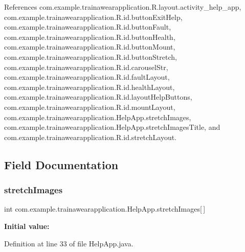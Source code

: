 References com.\+example.\+trainawearapplication.\+R.\+layout.\+activity\+\_\+help\+\_\+app, com.\+example.\+trainawearapplication.\+R.\+id.\+button\+Exit\+Help, com.\+example.\+trainawearapplication.\+R.\+id.\+button\+Fault, com.\+example.\+trainawearapplication.\+R.\+id.\+button\+Health, com.\+example.\+trainawearapplication.\+R.\+id.\+button\+Mount, com.\+example.\+trainawearapplication.\+R.\+id.\+button\+Stretch, com.\+example.\+trainawearapplication.\+R.\+id.\+carousel\+Str, com.\+example.\+trainawearapplication.\+R.\+id.\+fault\+Layout, com.\+example.\+trainawearapplication.\+R.\+id.\+health\+Layout, com.\+example.\+trainawearapplication.\+R.\+id.\+layout\+Help\+Buttons, com.\+example.\+trainawearapplication.\+R.\+id.\+mount\+Layout, com.\+example.\+trainawearapplication.\+Help\+App.\+stretch\+Images, com.\+example.\+trainawearapplication.\+Help\+App.\+stretch\+Images\+Title, and com.\+example.\+trainawearapplication.\+R.\+id.\+stretch\+Layout.



\subsection{Field Documentation}
\mbox{\label{classcom_1_1example_1_1trainawearapplication_1_1_help_app_a409e91221d680c3d801ea24a3f58fcdc}} 
\subsubsection{\texorpdfstring{stretchImages}{stretchImages}}
{\footnotesize\ttfamily int com.\+example.\+trainawearapplication.\+Help\+App.\+stretch\+Images\mbox{[}$\,$\mbox{]}\hspace{0.3cm}{\ttfamily [private]}}

{\bfseries Initial value\+:}
\begin{DoxyCode}{0}
\DoxyCodeLine{= \textcolor{keyword}{new} \textcolor{keywordtype}{int}[]\{}
\DoxyCodeLine{    \}}

\end{DoxyCode}


Definition at line 33 of file Help\+App.\+java.



